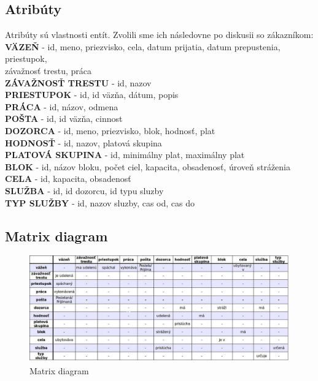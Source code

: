 \documentclass[slovak, 12pt, Times New Roman]{article}
\begin{document}
		\subsection{Atribúty}
			Atribúty sú vlastnosti entít. Zvolili sme ich následovne po diskusii so zákazníkom: \\
			\textbf{VÄZEŇ} - id, meno, priezvisko, cela, datum prijatia, datum prepustenia, priestupok, \\ závažnosť trestu, práca\\
			\textbf{ZÁVAŽNOSŤ TRESTU} - id, nazov\\
			\textbf{PRIESTUPOK} - id, id väzňa, dátum, popis\\
			\textbf{PRÁCA} - id, názov, odmena\\
			\textbf{POŠTA} - id, id väzňa, cinnost\\
			\textbf{DOZORCA} - id, meno, priezvisko, blok, hodnosť, plat \\
			\textbf{HODNOSŤ} - id, nazov, platová skupina\\
			\textbf{PLATOVÁ SKUPINA} - id, minimálny plat, maximálny plat\\
			\textbf{BLOK} - id, názov bloku, počet ciel, kapacita, obsadenosť, úroveň stráženia\\
			\textbf{CELA} - id, kapacita, obsadenosť\\
			\textbf{SLUŽBA} - id, id dozorcu, id typu sluzby\\
			\textbf{TYP SLUŽBY} - id, nazov sluzby, cas od, cas do\\
		\subsection{Matrix diagram}
			\begin{figure}[!htb]
				\centering
				\includegraphics[scale=0.45]{matrixDia.png}
				\caption{Matrix diagram}
				\label{fig:Reinforcement}
			\end{figure}
\end{document}
